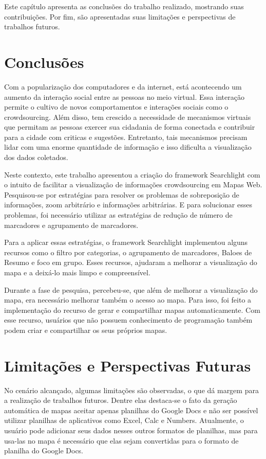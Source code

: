 Este capítulo apresenta as conclusões do trabalho realizado, mostrando suas contribuições. Por fim, são apresentadas suas limitações e perspectivas de trabalhos futuros.

\section{Conclusões}
Com a popularização dos computadores e da internet, está acontecendo um aumento da interação social entre as pessoas no meio virtual. Essa interação permite o cultivo de novos comportamentos e interações sociais como o crowdsourcing. Além disso, tem crescido a necessidade de mecanismos virtuais que permitam as pessoas exercer sua cidadania de forma conectada e contribuir para a cidade com  criticas e sugestões. Entretanto, tais mecanismos precisam lidar com uma enorme quantidade de informação e isso dificulta a visualização dos dados coletados.

Neste contexto, este trabalho apresentou a criação do framework Searchlight com o intuito de facilitar a visualização de informações crowdsourcing em Mapas Web. Pesquisou-se por estratégias para resolver os problemas de sobreposição de informações, zoom arbitrário e informações arbitrárias. E para solucionar esses problemas, foi necessário utilizar as estratégias de redução de número de marcadores e agrupamento de marcadores.

Para a aplicar essas estratégias, o framework Searchlight implementou alguns recursos como o filtro por categorias, o agrupamento de marcadores, Baloes de Resumo e foco em grupo. Esses recursos, ajudaram a melhorar a visualização do mapa e a deixá-lo mais limpo e compreensível.

Durante a fase de pesquisa, percebeu-se, que além de melhorar a visualização do mapa, era necessário  melhorar também o acesso ao mapa. Para isso, foi feito a implementação do recurso de gerar e compartilhar mapas automaticamente. Com esse recurso, usuários que não possuem conhecimento de programação também podem criar  e compartilhar os seus próprios mapas.



\section{Limitações e Perspectivas Futuras}


No cenário alcançado, algumas limitações são observadas, o que dá margem para a realização de trabalhos futuros. Dentre elas destaca-se o fato da geração automática de mapas aceitar apenas planilhas do Google Docs e não ser possível utilizar planilhas de aplicativos como Excel, Calc e Numbers. Atualmente, o usuário pode adicionar seus dados nesses outros formatos de planilhas, mas para usa-las no mapa  é necessário que elas sejam convertidas para  o formato de planilha do Google Docs.

